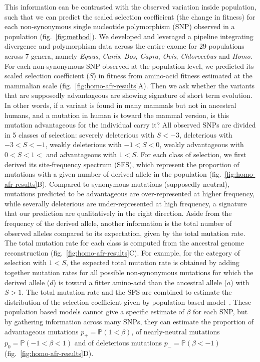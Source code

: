 \documentclass{article}
\newcommand{\proba}{\mathbb{P}}
\newcommand{\Spop}{\beta}
\newcommand{\Sphy}{S}
\begin{document}
    This information can be contrasted with the observed variation inside population, such that we can predict the scaled selection coefficient (the change in fitness) for each non-synonymous single nucleotide polymorphism (SNP) observed in a population (fig.~\ref{fig:method}).
    We developed and leveraged a pipeline integrating divergence and polymorphism data across the entire exome for 29 populations across 7 genera, namely \textit{Equus}, \textit{Canis}, \textit{Bos}, \textit{Capra}, \textit{Ovis}, \textit{Chlorocebus} and \textit{Homo}.
    For each non-synonymous SNP observed at the population level, we predicted its scaled selection coefficient ($\Sphy$) in fitness from amino-acid fitness estimated at the mammalian scale (fig.~\ref{fig:homo-afr-results}A).
    Then we ask whether the variants that are supposedly advantageous are showing signature of short term evolution.
    In other words, if a variant is found in many mammals but not in ancestral humans, and a mutation in human is toward the mammal version, is this mutation advantageous for the individual carry it?
    All observed SNPs are divided in 5 classes of selection: severely deleterious with $\Sphy<-3$, deleterious with $-3<\Sphy<-1$, weakly deleterious with $-1<\Sphy<0$, weakly advantageous with $0<\Sphy<1<$ and advantageous with $1<\Sphy$.
    For each class of selection, we first derived its site-frequency spectrum (SFS), which represent the proportion of mutations with a given number of derived allele in the population (fig.~\ref{fig:homo-afr-results}B).
    Compared to synonymous mutations (supposedly neutral), mutations predicted to be advantageous are over-represented at higher frequency, while severally deleterious are under-represented at high frequency, a signature that our prediction are qualitatively in the right direction.
    Aside from the frequency of the derived allele, another information is the total number of observed alleles compared to its expectation, given by the total mutation rate.
    The total mutation rate for each class is computed from the ancestral genome reconstruction (fig.~\ref{fig:homo-afr-results}C).
    For example, for the category of selection with $1<\Sphy$, the expected total mutation rate is obtained by adding together mutation rates for all possible non-synonymous mutations for which the derived allele ($d$) is toward a fitter amino-acid than the ancestral allele ($a$) with $S > 1$.
    The total mutation rate and the SFS are combined to estimate the distribution of the selection coefficient given by population-based model~\cite{tataru_inference_2017, tataru_polydfe_2020}.
    These population based models cannot give a specific estimate of $\Spop$ for each SNP, but by gathering information across many SNPs, they can estimate the proportion of advantageous mutations $p_+=\proba \left( 1 < \Spop \right)$, of nearly-neutral mutations $p_0=\proba \left( -1 < \Spop < 1 \right)$ and of deleterious mutations $p_-=\proba \left( \Spop < -1 \right)$ (fig.~\ref{fig:homo-afr-results}D).
\end{document}
